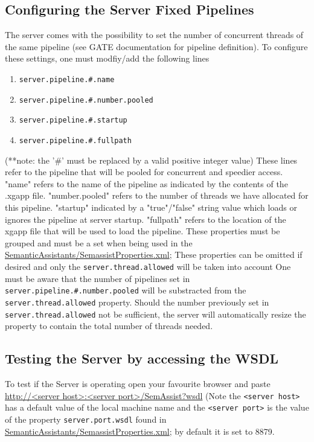 \subsection{Configuring the Server Fixed Pipelines}
The server comes with the possibility to set the number of concurrent threads
of the same pipeline (see GATE documentation for pipeline definition).  To 
configure these settings, one must modfiy/add the following lines
\begin{enumerate}
\item \texttt{server.pipeline.\#.name}
\item \texttt{server.pipeline.\#.number.pooled}
\item \texttt{server.pipeline.\#.startup}
\item \texttt{server.pipeline.\#.fullpath}
\end{enumerate}
(**note: the '\#' must be replaced by a valid positive integer value)
These lines refer to the pipeline that will be pooled for concurrent and
speedier access.  
"name" refers to the name of the pipeline as indicated by the contents of the .xgapp file.
"number.pooled" refers to the number of threads we have allocated for this pipeline.
"startup" indicated by a "true"/"false" string value which loads or ignores the pipeline at server startup.
"fullpath" refers to the location of the xgapp file that will be used to load the pipeline.
These properties must be grouped and must be a set when being used in the \url{SemanticAssistants/SemassistProperties.xml};
These properties can be omitted if desired and only the \texttt{server.thread.allowed} will be taken into account
One must be aware that the number of pipelines set in \texttt{server.pipeline.\#.number.pooled}
will be substracted from the \texttt{server.thread.allowed} property.  Should the number previously
set in \texttt{server.thread.allowed} not be sufficient, the server will automatically resize the property
to contain the total number of threads needed.

\subsection{Testing the Server by accessing the WSDL}
To test if the Server is operating open your favourite browser and
paste \url{http://<server host>:<server port>/SemAssist?wsdl} (Note
the \texttt{<server host>} has a default value of the local machine
name and the \texttt{<server port>} is the value of the property
\texttt{server.port.wsdl} found in
\url{SemanticAssistants/SemassistProperties.xml}; by default it is set
to 8879.


